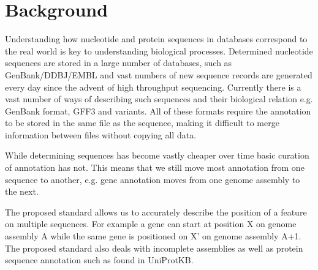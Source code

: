 \section*{Background}
Understanding how nucleotide and protein sequences in databases correspond to the real world is key to understanding biological processes.
Determined nucleotide sequences are stored in a large number of databases, such as GenBank/DDBJ/EMBL and vast numbers of new sequence records are generated every day since the advent of high throughput sequencing. Currently there is a vast number of ways of describing such sequences and their biological relation e.g. GenBank format, GFF3 and variants. All of these formats require the annotation to be stored in the same file as the sequence, making it difficult to merge information between files without copying all data.

While determining sequences has become vastly cheaper over time basic curation of annotation has not. This means that we still move most annotation from one sequence to another, e.g. gene annotation moves from one genome assembly to the next.

The proposed standard allows us to accurately describe the position of a feature on multiple sequences. For example a gene can start at position X on genome assembly A while the same gene is positioned on X' on genome assembly A+1. The proposed standard also deals with incomplete assemblies as well as protein sequence annotation such as found in UniProtKB.
